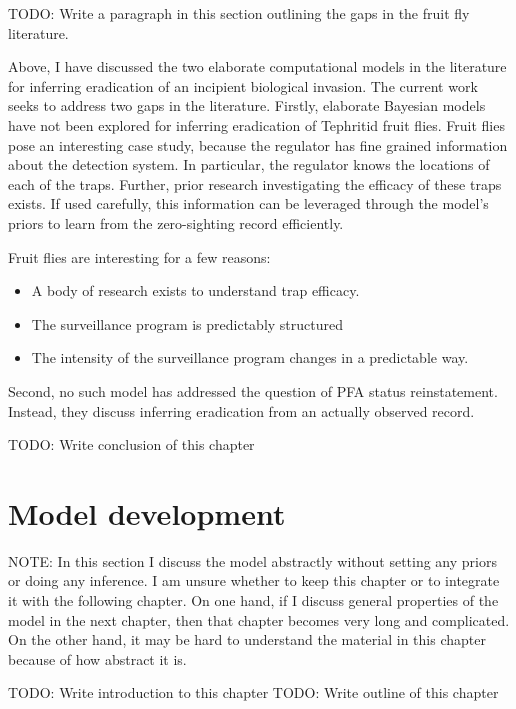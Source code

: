 \documentclass[
]{book}
\providecommand{\tightlist}{%
  \setlength{\itemsep}{0pt}\setlength{\parskip}{0pt}}
\begin{document}
TODO: Write a paragraph in this section outlining the gaps in the fruit fly literature.

Above, I have discussed the two elaborate computational models in the literature for inferring eradication of an incipient biological invasion. The current work seeks to address two gaps in the literature. Firstly, elaborate Bayesian models have not been explored for inferring eradication of Tephritid fruit flies. Fruit flies pose an interesting case study, because the regulator has fine grained information about the detection system. In particular, the regulator knows the locations of each of the traps. Further, prior research investigating the efficacy of these traps exists. If used carefully, this information can be leveraged through the model's priors to learn from the zero-sighting record efficiently.

Fruit flies are interesting for a few reasons:

\begin{itemize}
\tightlist
\item
  A body of research exists to understand trap efficacy.
\item
  The surveillance program is predictably structured
\item
  The intensity of the surveillance program changes in a predictable way.
\end{itemize}

Second, no such model has addressed the question of PFA status reinstatement. Instead, they discuss inferring eradication from an actually observed record.

TODO: Write conclusion of this chapter

\hypertarget{model-development}{%
\chapter{Model development}\label{model-development}}

NOTE: In this section I discuss the model abstractly without setting any priors or doing any inference. I am unsure whether to keep this chapter or to integrate it with the following chapter. On one hand, if I discuss general properties of the model in the next chapter, then that chapter becomes very long and complicated. On the other hand, it may be hard to understand the material in this chapter because of how abstract it is.

TODO: Write introduction to this chapter
TODO: Write outline of this chapter
\end{document}
